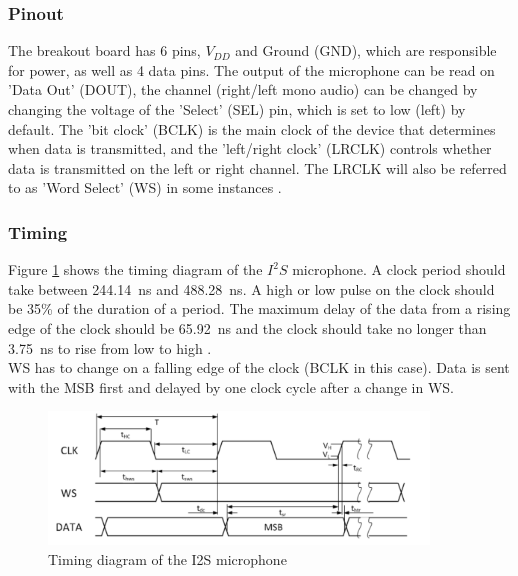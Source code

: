 \subsubsection{Pinout}

The breakout board has 6 pins, $V_{DD}$ and Ground (GND), which are responsible for power, as well as 4 data pins.
The output of the microphone can be read on 'Data Out' (DOUT), the channel (right/left mono audio) can be changed by
changing the voltage of the 'Select' (SEL) pin, which is set to low (left) by default.
The 'bit clock' (BCLK) is the main clock of the device that determines when data is transmitted, and the 'left/right clock' (LRCLK)
controls whether data is transmitted on the left or right channel.
The LRCLK will also be referred to as 'Word Select' (WS) in some instances \cite{i2s_mic_pinout}.

\subsubsection{Timing}

Figure \ref{fig:i2s_timing} shows the timing diagram of the $I^2S$ microphone.
A clock period should take between \SI{244.14}{\nano\second} and \SI{488.28}{\nano\second}.
A high or low pulse on the clock should be 35\% of the duration of a period.
The maximum delay of the data from a rising edge of the clock should be \SI{65.92}{\nano\second}
and the clock should take no longer than \SI{3.75}{\nano\second} to rise from low to high \cite{i2s_mic_datasheet}.
\\
WS has to change on a falling edge of the clock (BCLK in this case).
Data is sent with the MSB first and delayed by one clock cycle after a change in WS.

\begin{figure}[htb]
    \centering
    \includegraphics[width=0.9\textwidth]{figures/i2s_timing.png}
    \caption[Timing diagram of the SPH0645LM4H-B I2S mic \cite{i2s_mic_datasheet}]{Timing diagram of the I2S microphone}
    \label{fig:i2s_timing}
\end{figure}

